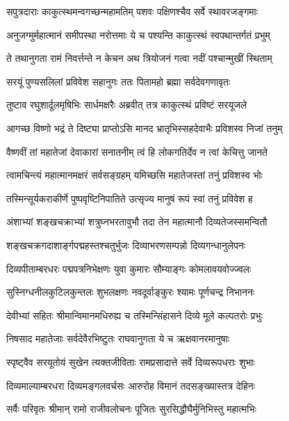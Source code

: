\twolineshloka
{सपुत्रदाराः काकुत्स्थमन्वगच्छन्महामतिम्}
{पशवः पक्षिणश्चैव सर्वे स्थावरजङ्गमाः}%

\twolineshloka
{अनुजग्मुर्महात्मानं समीपस्था नरोत्तमाः}
{ये च पश्यन्ति काकुत्स्थं स्वपथान्तर्गतं प्रभुम्}%

\twolineshloka
{ते तथानुगता रामं निवर्त्तन्ते न केचन}
{अथ त्रियोजनं गत्वा नदीं पश्चान्मुखीं स्थिताम्}%

\twolineshloka
{सरयूं पुण्यसलिलां प्रविवेश सहानुगः}
{ततः पितामहो ब्रह्मा सर्वदेवगणावृतः}%

\twolineshloka
{तुष्टाव रघुशार्दूलमृषिभिः सार्धमक्षरैः}
{अब्रवीत् तत्र काकुत्स्थं प्रविष्टं सरयूजले}%


\twolineshloka
{आगच्छ विष्णो भद्रं ते दिष्ट्या प्राप्तोऽसि मानद}
{भ्रातृभिस्सहदेवाभैः प्रविशस्व निजां तनुम्}%

\twolineshloka
{वैष्णवीं तां महातेजां देवाकारां सनातनीम्}
{त्वं हि लोकगतिर्देव न त्वां केचित्तु जानते}%

\twolineshloka
{त्वामचिन्त्यं महात्मानमक्षरं सर्वसङ्ग्रहम्}
{यमिच्छसि महातेजस्तां तनुं प्रविशस्व भोः}%


\twolineshloka
{तस्मिन्सूर्यकराकीर्णे पुष्पवृष्टिनिपातिते}
{उत्सृज्य मानुषं रूपं स्वां तनुं प्रविवेश ह}%

\twolineshloka
{अंशाभ्यां शङ्खचक्राभ्यां शत्रुघ्नभरतावुभौ}
{तदा तेन महात्मानौ दिव्यतेजस्समन्वितौ}%

\twolineshloka
{शङ्खचक्रगदाशार्ङ्गपद्महस्तश्चतुर्भुजः}
{दिव्याभरणसम्पन्नो दिव्यगन्धानुलेपनः}%

\twolineshloka
{दिव्यपीताम्बरधरः पद्मपत्रनिभेक्षणः}
{युवा कुमारः सौम्याङ्गः कोमलावयवोज्ज्वलः}%

\twolineshloka
{सुस्निग्धनीलकुटिलकुन्तलः शुभलक्षणः}
{नवदूर्वाङ्कुरः श्यामः पूर्णचन्द्र निभाननः}%

\twolineshloka
{देवीभ्यां सहितः श्रीमान्विमानमधिरुह्य च}
{तस्मिन्सिंहासने दिव्ये मूले कल्पतरोः प्रभुः}%

\twolineshloka
{निषसाद महातेजाः सर्वदेवैरभिष्टुतः}
{राघवानुगता ये च ऋक्षवानरमानुषाः}%

\twolineshloka
{स्पृष्ट्वैव सरयूतोयं सुखेन त्यक्तजीविताः}
{रामप्रसादात्ते सर्वे दिव्यरूपधराः शुभाः}%

\twolineshloka
{दिव्यमाल्याम्बरधरा दिव्यमङ्गलवर्चसः}
{आरुरोह विमानं तदसङ्ख्यास्तत्र देहिनः}%

\twolineshloka
{सर्वैः परिवृतः श्रीमान् रामो राजीवलोचनः}
{पूजितः सुरसिद्धौघैर्मुनिभिस्तु महात्मभिः}%

